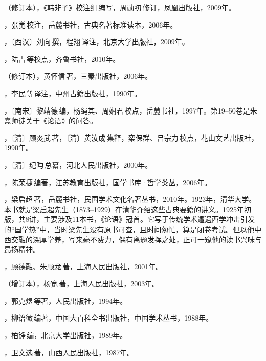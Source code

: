 （修订本），《韩非子》校注组\,编写，周勋初\,修订，凤凰出版社，2009年。

，张觉\,校注，岳麓书社，古典名著标准读本，2006年。

，〔西汉〕刘向\,撰，程翔\,译注，北京大学出版社，2009年。

，陆吉\,等校点，齐鲁书社，2010年。

（修订本），黄怀信\,著，三秦出版社，2006年。

，李民\,等译注，中州古籍出版社，1990年。

，〔南宋〕黎靖德\,编，杨绳其、周娴君\,校点，岳麓书社，1997年。第19--50卷是朱熹师徒关于《论语》的问答。

，〔清〕顾炎武\,著，〔清〕黄汝成\,集释，栾保群、吕宗力\,校点，花山文艺出版社，1990年。

，〔清〕纪昀\,总纂，河北人民出版社，2000年。

，陈荣捷\,编著，江苏教育出版社，国学书库·哲学类丛，2006年。

，梁启超\,著，岳麓书社，民国学术文化名著丛书，2010年。1923年，清华大学。本书就是梁启超先生（1873--1929）在清华介绍这些古典要籍的讲义。1925年初版，共8讲，主要涉及11本书，《论语》冠首。它写于传统学术遭遇西学冲击引发的“国学热”中，当时梁先生没有原书可查，且时间匆忙，算是闭卷考试。但以他中西交融的深厚学养，写来毫不费力，偶有离题发挥之处，正可一窥他的读书兴味与昂扬精神。

，顾德融、朱顺龙\,著，上海人民出版社，2001年。

（增订本），杨宽\,著，上海人民出版社，2003年。

，郭克煜\,等著，人民出版社，1994年。

，柳诒徵\,编著，中国大百科全书出版社，中国学术丛书，1988年。

，柏铮\,编，北京大学出版社，1989年。

，卫文选\,著，山西人民出版社，1987年。
